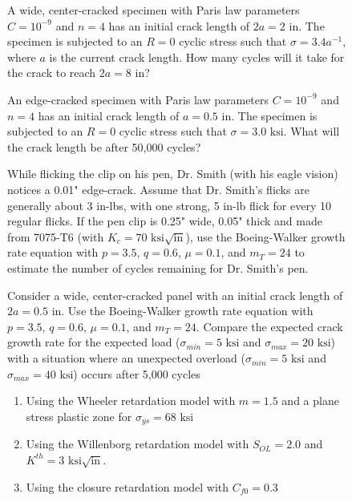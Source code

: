 \documentclass[12pt, oneside]{article}
\begin{document}
\begin{enumerate}

\begin{figure}[H]
	\item A wide, center-cracked specimen with Paris law parameters $C=10^{-9}$ and $n=4$ has an initial crack length of $2a = 2 \text{ in}$. 
	The specimen is subjected to an $R=0$ cyclic stress such that $\sigma = 3.4a^{-1}$, where $a$ is the current crack length. 
	How many cycles will it take for the crack to reach $2a = 8 \text{ in}$?
\end{figure}

\begin{figure}[H]
	\item An edge-cracked specimen with Paris law parameters $C=10^{-9}$ and $n=4$ has an initial crack length of $a = 0.5 \text{ in}$. 
	The specimen is subjected to an $R=0$ cyclic stress such that $\sigma = 3.0 \text{ ksi}$.
	What will the crack length be after 50,000 cycles?
\end{figure}

\begin{figure}[H]
	\item While flicking the clip on his pen, Dr. Smith (with his eagle vision) notices a 0.01" edge-crack.
	Assume that Dr. Smith's flicks are generally about 3 in-lbs, with one strong, 5 in-lb flick for every 10 regular flicks.
	If the pen clip is 0.25" wide, 0.05" thick and made from 7075-T6 (with $K_c = 70 \text{ ksi}\sqrt{\text{in}}$), use the Boeing-Walker growth rate equation with $p=3.5$, $q=0.6$, $\mu=0.1$, and $m_T = 24$ to estimate the number of cycles remaining for Dr. Smith's pen.
\end{figure}

\begin{figure}[H]
	\item Consider a wide, center-cracked panel with an initial crack length of $2a = 0.5 \text{ in}$.
	Use the Boeing-Walker growth rate equation with $p=3.5$, $q=0.6$, $\mu=0.1$, and $m_T = 24$.
	Compare the expected crack growth rate for the expected load ($\sigma_{min} = 5 \text{ ksi}$ and $\sigma_{max} = 20 \text{ ksi}$) with a situation where an unexpected overload ($\sigma_{min} = 5 \text{ ksi}$ and $\sigma_{max} = 40 \text{ ksi}$) occurs after 5,000 cycles
	\begin{enumerate}
		\item Using the Wheeler retardation model with $m = 1.5$ and a plane stress plastic zone for $\sigma_{ys} = 68 \text{ ksi}$
		\item Using the Willenborg retardation model with $S_{OL} = 2.0$ and $K^{th} = 3 \text{ ksi}\sqrt{\text{in}}$.
		\item Using the closure retardation model with $C_{f0} = 0.3$
	\end{enumerate}
\end{figure}

\end{enumerate}
\end{document}
